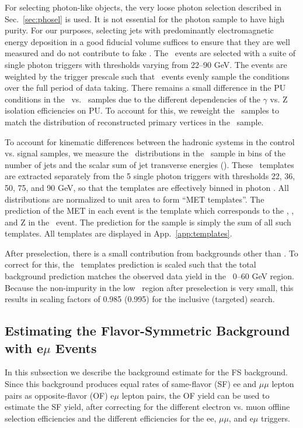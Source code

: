 For selecting photon-like objects, the very loose photon selection described in Sec.~\ref{sec:phosel} is used.
It is not essential for the photon sample to have high purity. For our purposes, selecting jets with predominantly 
electromagnetic energy deposition in a good fiducial volume suffices to ensure that 
they are well measured and do not contribute to fake \MET. The \gjets\ events are selected with a suite of
single photon triggers with \pt thresholds varying from 22--90 GeV. The events are weighted by the trigger prescale
such that \gjets\ events evenly sample the conditions over the full period of data taking.
There remains a small difference in the PU conditions in the \gjets\ vs. \zjets\ samples due to the different
dependencies of the $\gamma$ vs. Z isolation efficiencies on PU. To account for this, we reweight the \gjets\ samples
to match the distribution of reconstructed primary vertices in the \zjets\ sample.

To account for kinematic differences between the hadronic systems in the control vs. signal 
samples, we measure the \MET\ distributions in the \gjets\ sample in bins of the number of jets 
and the scalar sum of jet transverse energies (\Ht). These \MET\ templates are extracted separately from the 5 single photon
triggers with thresholds 22, 36, 50, 75, and 90 GeV, so that the templates are effectively binned in photon \pt.
All \MET distributions are normalized to unit area to form ``MET templates''.
The prediction of the MET in each \Z event is the template which corresponds to the \njets,
\Ht, and Z \pt in the \zjets\ event. The prediction for the \Z sample is simply the sum of all such templates.
All templates are displayed in App.~\ref{app:templates}.

After preselection, there is  a small contribution from backgrounds other than \zjets. To correct for this, the \MET\ templates
prediction is scaled such that the total background prediction matches the observed data yield in the \MET\ 0--60 GeV region.
Because the non-\zjets impurity in the low \MET\ region after preselection is very small, this results in 
scaling factors of 0.985 (0.995) for the inclusive (targeted) search.

\subsection{Estimating the Flavor-Symmetric Background with e$\mu$ Events}
\label{sec:bkg_fs}

In this subsection we describe the background estimate for the FS background. Since this background produces equal rates of same-flavor (SF)
ee and $\mu\mu$ lepton pairs as opposite-flavor (OF) e$\mu$ lepton pairs, the OF yield can be used to estimate the SF yield, after
correcting for the different electron vs. muon offline selection efficiencies and the different efficiencies for the ee, $\mu\mu$, and e$\mu$ triggers.

